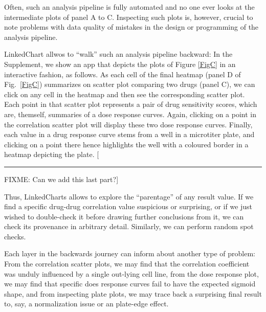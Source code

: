 \documentclass[twocolumn,10pt]{article}
\newcommand{\blockade}{\rule{3em}{0.7em}}  %
\newcommand{\fixme}[1]{[ \blockade FIXME: #1]}
\begin{document}
Often, such an analysis pipeline is fully automated and no one ever looks at the intermediate plots of panel A to C. Inspecting such plots is, however, crucial to note problems with data quality of mistakes in the design or programming of the analysis pipeline.

LinkedChart allwos to ``walk'' such an analysis pipeline backward: In the Supplement, we show an app that depicts the plots of Figure \ref{FigC} in an interactive fashion, as follows. As each cell of the final heatmap (panel D of Fig.\ \ref{FigC}) summarizes on scatter plot comparing two drugs (panel C), we can click on any cell in the heatmap and then see the corresponding scatter plot. Each point in that scatter plot represents a pair of drug sensitivity scores, which are, themself, summaries of a dose response curves. Again, clicking on a point in the correlation scatter plot will display these two dose response curves. Finally, each value in a drug response curve stems from a well in a microtiter plate, and clicking on a point there hence highlights the well with a coloured border in a heatmap depicting the plate. \fixme{Can we add this last part?}

Thus, LinkedCharts allows to explore the ``parentage'' of any result value. If we find a specific drug-drug correlation value suspicious or surprising, or if we just wished to double-check it before drawing further conclusions from it, we can check its provenance in arbitrary detail. Similarly, we can perform random spot checks. 

Each layer in the backwards journey can inform about another type of problem: From the correlation scatter plots, we may find that the correlation coefficient was unduly influenced by a single out-lying cell line, from the dose response plot, we may find that specific does response curves fail to have the expected sigmoid shape, and from inspecting plate plots, we may trace back a surprising final result to, say, a normalization issue or an plate-edge effect.
\end{document}
